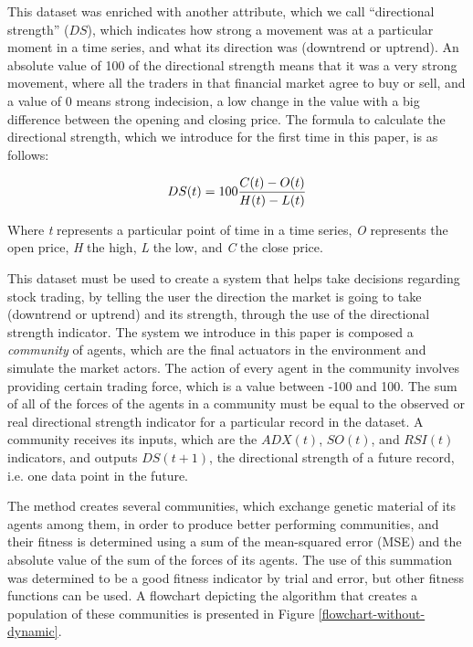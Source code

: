 \documentclass[a4paper,twoside]{article}
\begin{document}
This dataset was enriched with another attribute, which we call
``directional strength'' ($DS$), which indicates how strong a movement was at
a particular moment in a time series, and 
what its direction was (downtrend or uptrend). An absolute value of
100 of the directional strength means that it was a very strong
movement, where all the traders in that financial market agree to buy
or sell, and a value of 0 means strong indecision, a low change in the
value with a big difference between the opening and closing price.
The formula to calculate the directional strength, which we introduce
for the first time in this paper, is as follows: 

\begin{equation} \label{directional-strength}
  DS(t) = 100{{C(t) - O(t)} \over {H(t) - L(t)}}
\end{equation}

Where \textit{t} represents a particular point of time in a time
series, \textit{O} represents the open price, \textit{H} the high,
\textit{L} the low, and \textit{C} the close price.

This dataset must be used to create a system that helps take decisions
regarding stock trading, by telling the user the
direction the market is going to take (downtrend or uptrend) and
its strength, through the use of the directional strength
indicator. The system we introduce in this paper is composed a {\em
  community}  of agents,  which
are the final actuators in the environment and simulate the market
actors. The action of every agent in the community involves 
providing certain trading force, which is a value between -100 and
100. The sum of all of the forces of the agents in a community must be
equal to the observed or real directional strength indicator for a
particular record in the dataset. A community receives its inputs,
which are the $ADX(t)$, $SO(t)$, and $RSI(t)$ indicators,
and outputs  $DS(t+1)$, the directional strength of a
future record, i.e. one data point in the future. 

The method creates several communities, which exchange genetic
material of its agents among them, in order to produce better
performing communities, and their fitness is determined using a sum of
the mean-squared error (MSE) and the absolute value of the sum of the
forces of its agents. The use of this summation was determined to be a
good fitness indicator by trial and error, but other fitness functions
can be used. A flowchart depicting the algorithm that creates a
population of these communities is presented in Figure
\ref{flowchart-without-dynamic}. %
\end{document}
